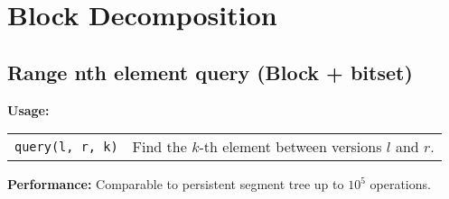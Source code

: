\section{Block Decomposition}
\subsection{Range nth element query (Block + bitset)}
\textbf{Usage:} \\[0.1cm]
\begin{tabular}{p{4cm} p{7.5cm}}
  \lstinline|query(l, r, k)| & Find the $k$-th element between versions $l$ and $r$. \\
\end{tabular} \par
\textbf{Performance:} Comparable to persistent segment tree up to $10^5$ operations. \par



